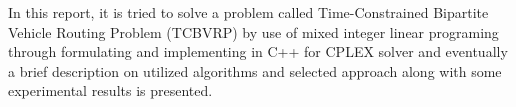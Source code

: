 In this report, it is tried to solve a problem called Time-Constrained Bipartite
Vehicle Routing Problem (TCBVRP) by use of mixed integer linear programing
through formulating and implementing in C++ for CPLEX solver and eventually a brief
description on utilized algorithms and selected approach along with
some experimental results is presented.
